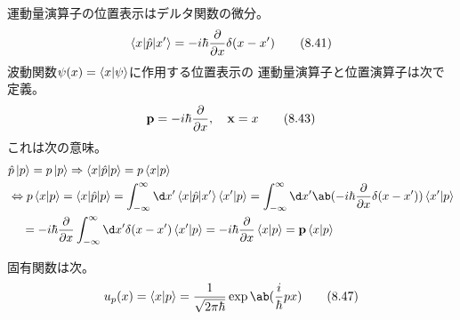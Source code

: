 運動量演算子の位置表示はデルタ関数の微分。
\begin{equation}
  \label{eq:p_in_x}
  \braket{x|\hat{p}|x'}
  =-i\hbar\pdv{}{x}\delta(x-x')
  \tag{8.41}
\end{equation}
波動関数$\psi(x)=\braket{x|\psi}$に作用する位置表示の
運動量演算子と位置演算子は次で定義。
\begin{equation}
  \vb{p}=-i\hbar\pdv{}{x},\quad
  \vb{x}=x
  \tag{8.43}
\end{equation}
これは次の意味。
\begin{equation}
  \begin{split}
    &\hat{p}\ket{p}=p\ket{p}
    \Rightarrow
    \braket{x|\hat{p}|p}
    =p\braket{x|p} \\
    &\Leftrightarrow
    p\braket{x|p}
    =\braket{x|\hat{p}|p}
    =\int_{-\infty}^\infty\d x'
    \braket{x|\hat{p}|x'}\braket{x'|p}
    =\int_{-\infty}^\infty\d x'
    \ab(-i\hbar\pdv{}{x}\delta(x-x'))\braket{x'|p} \\
    &\quad\,=
    -i\hbar\pdv{}{x}
    \int_{-\infty}^\infty\d x'
    \delta(x-x')\braket{x'|p}
    =-i\hbar\pdv{}{x}\braket{x|p}
    =\vb{p}\braket{x|p}
  \end{split}
\end{equation}

固有関数は次。
\begin{equation}
  \label{eq:xp_eigenfunction}
  u_p(x)
  =\braket{x|p}
  =\frac{1}{\sqrt{2\pi\hbar}}\exp\ab(\frac{i}{\hbar}px)
  \tag{8.47}
\end{equation}